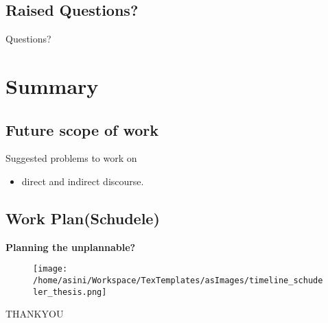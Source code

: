 \documentclass{beamer}
\begin{document}
\subsection{Raised Questions?}
\begin{frame}{Questions?}

\end{frame}

\section{Summary}
\subsection{Future scope of work}
\begin{frame}{Suggested problems to work on}
	\begin{itemize}
		\item direct and indirect  discourse.
	\end{itemize}
\end{frame}
\subsection{Work Plan(Schudele)}
\begin{frame}{\textbf{Planning the unplannable?}}
\begin{center}
\begin{figure}
	\texttt{[image: /home/asini/Workspace/TexTemplates/asImages/timeline\_schudeler\_thesis.png]}
\end{figure}
\end{center}
\end{frame}

\begin{frame}
\centering \LARGE THANKYOU
\end{frame}
\end{document}
